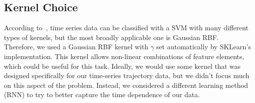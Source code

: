 \subsection{Kernel Choice}
According to~\cite{Rüping01svmkernels}, time series data can be classified with a SVM with many different types of kernels, but the most broadly applicable one is Gaussian RBF.
Therefore, we used a Gaussian RBF kernel with $\gamma$ set automatically by SKLearn's implementation.
This kernel allows non-linear combinations of feature elements, which could be useful for this task.
Ideally, we would use some kernel that was designed specifically for our time-series trajectory data, but we didn't focus much on this aspect of the problem.
Instead, we considered a different learning method (RNN) to try to better capture the time dependence of our data.





